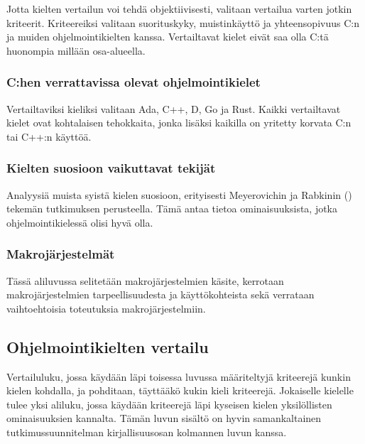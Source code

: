 Jotta kielten vertailun voi tehdä objektiivisesti, valitaan vertailua varten
jotkin kriteerit. Kriteereiksi valitaan suorituskyky, muistinkäyttö ja
yhteensopivuus C:n ja muiden ohjelmointikielten kanssa. Vertailtavat kielet
eivät saa olla C:tä huonompia millään osa-alueella.

\subsubsection{C:hen verrattavissa olevat ohjelmointikielet}

Vertailtaviksi kieliksi valitaan Ada, C++, D, Go ja Rust. Kaikki vertailtavat
kielet ovat kohtalaisen tehokkaita, jonka lisäksi kaikilla on yritetty korvata
C:n tai C++:n käyttöä.

\subsubsection{Kielten suosioon vaikuttavat tekijät}

Analyysiä muista syistä kielen suosioon, erityisesti Meyerovichin ja Rabkinin
(\citeyear{empiricalpopularity}) tekemän tutkimuksen perusteella. Tämä antaa
tietoa ominaisuuksista, jotka ohjelmointikielessä olisi hyvä olla.


\subsubsection{Makrojärjestelmät}

Tässä aliluvussa selitetään makrojärjestelmien käsite, kerrotaan
makrojärjestelmien tarpeellisuudesta ja käyttökohteista sekä verrataan
vaihtoehtoisia toteutuksia makrojärjestelmiin.

\subsection{Ohjelmointikielten vertailu}

Vertailuluku, jossa käydään läpi toisessa luvussa määriteltyjä kriteerejä
kunkin kielen kohdalla, ja pohditaan, täyttääkö kukin kieli kriteerejä.
Jokaiselle kielelle tulee yksi aliluku, jossa käydään kriteerejä läpi kyseisen
kielen yksilöllisten ominaisuuksien kannalta. Tämän luvun sisältö on hyvin
samankaltainen tutkimussuunnitelman kirjallisuusosan kolmannen luvun kanssa.

